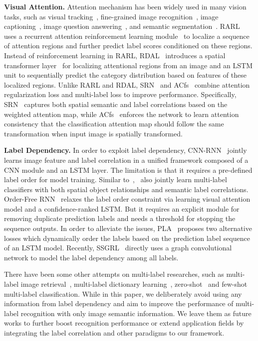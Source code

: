 \documentclass[journal]{IEEEtran}
\begin{document}
\noindent \textbf{Visual Attention.}  
Attention mechanism has been widely used in many vision tasks, such as visual tracking~\cite{bazzani2011learning}, fine-grained image recognition~\cite{fu2017look}, image captioning~\cite{xu2015show}, image question answering~\cite{anderson2018bottom}, and semantic segmentation~\cite{hong2016learning}. RARL~\cite{chen2018recurrent}  uses a recurrent attention reinforcement learning module~\cite{mnih2014recurrent} to localize a sequence of attention regions and further predict label scores conditioned on these regions. Instead of reinforcement learning in RARL, RDAL~\cite{wang2017multi} introduces a spatial transformer layer~\cite{jaderberg2015spatial,yu2019delta} for localizing attentional regions from an image and an LSTM unit to sequentially predict the category distribution based on features of these localized regions. Unlike RARL and RDAL, SRN~\cite{zhu2017learning} and  ACfs~\cite{guo2019visual} combine attention regularization loss and multi-label loss to improve performance. Specifically, SRN~\cite{zhu2017learning} captures both spatial semantic and label correlations based on the weighted attention map, while ACfs~\cite{guo2019visual} enforces the network to learn attention consistency that the classification attention map should follow the same transformation when input image is spatially transformed.

\noindent \textbf{Label Dependency.} 
In order to exploit label dependency, CNN-RNN~\cite{wang2016cnn} jointly learns image feature and label correlation in a unified framework composed of a CNN module and an LSTM layer. The limitation is that it requires a pre-defined label order for model training. Similar to~\cite{wang2016cnn},~\cite{xu2020joint} also jointly learn multi-label classifiers with both spatial object relationships and semantic label correlations. 
Order-Free RNN~\cite{chen2018order} relaxes the label order constraint via learning visual attention model and a confidence-ranked LSTM. But it requires an explicit module for removing duplicate prediction labels and needs a threshold for stopping the sequence outputs.  In order to alleviate the issues, PLA~\cite{yazici2020orderless} proposes two alternative losses which dynamically order the labels based on the prediction label sequence of an LSTM model. Recently, SSGRL~\cite{chenlearning} directly uses a graph convolutional network to model the label dependency among all labels. 

There have been some other attempts on multi-label researches, such as multi-label image retrieval~\cite{7438833}, multi-label dictionary learning~\cite{jing2016multi}, zero-shot~\cite{ji2020deep,ji2020deep} and few-shot~\cite{9207855} multi-label classification. While in this paper, we deliberately avoid using any information from label dependency and aim to improve the performance of multi-label recognition with only image semantic information. We leave them as future works to further boost recognition performance or extend application fields by integrating the label correlation and other paradigms to our framework.  
\end{document}
